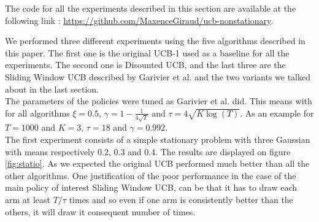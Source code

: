 The code for all the experiments described in this section are available at the following link : \url{https://github.com/MaxenceGiraud/ucb-nonstationary}.

We performed three different experiments using the five algorithms described in this paper. The first one is the original UCB-1 used as a baseline for all the experiments. The second one is Disounted UCB, and the last three are the Sliding Window UCB described by Garivier et al. \cite{garivier2008upperconfidence} and the two variants we talked about in the last section.\\
The parameters of the policies were tuned as Garivier et al. did. This means with for all algorithms $\xi = 0.5$, $\gamma = 1 - \frac{1}{4\sqrt{T}}$ and $\tau = 4 \sqrt{K \log(T)}$. As an example for $T=1000$ and $K=3$, $\tau = 18$ and $\gamma = 0.992$.\\

The first experiment consists of a simple stationary problem with three Gaussian with means respectively 0.2, 0.3 and 0.4. The results are displayed on figure \ref{fig:statio}. As we expected the original UCB performed much better than all the other algorithms. One justification of the poor performance in the case of the main policy of interest Sliding Window UCB, can be that it has to draw each arm at least $T/\tau$ times and so even if one arm is consistently better than the others, it will draw it consequent number of times.\\

